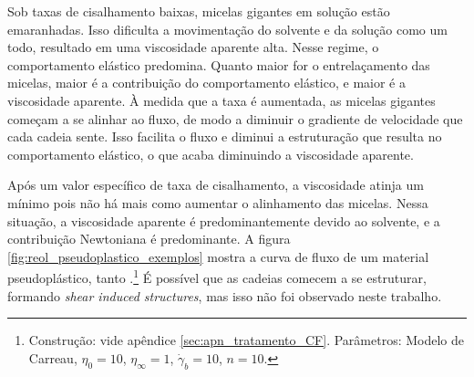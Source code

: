 			
			
			Sob taxas de cisalhamento baixas, micelas gigantes em solução estão emaranhadas. Isso dificulta a movimentação do solvente e da solução como um todo, resultado em uma viscosidade aparente alta. Nesse regime, o comportamento elástico predomina. Quanto maior for o entrelaçamento das micelas, maior é a contribuição do comportamento elástico, e maior é a viscosidade aparente. À medida que a taxa é aumentada, as micelas gigantes começam a se alinhar ao fluxo, de modo a diminuir o gradiente de velocidade que cada cadeia sente. Isso facilita o fluxo e diminui a estruturação que resulta no comportamento elástico, o que acaba diminuindo a viscosidade aparente.
			
			Após um valor específico de taxa de cisalhamento, a viscosidade atinja um mínimo pois não há mais como aumentar o alinhamento das micelas. Nessa situação, a viscosidade aparente é predominantemente devido ao solvente, e a contribuição Newtoniana é predominante. A figura \ref{fig:reol_pseudoplastico_exemplos} mostra a curva de fluxo de um material pseudoplástico, tanto .\footnote{Construção: vide apêndice \ref{sec:apn_tratamento_CF}. Parâmetros: Modelo de Carreau, \(\eta_0=10\), \(\eta_{\infty}=1\), \(\dot{\gamma}_b=10\), \(n=10\).} É possível que as cadeias comecem a se estruturar, formando \emph{shear induced structures}, mas isso não foi observado neste trabalho.
	
